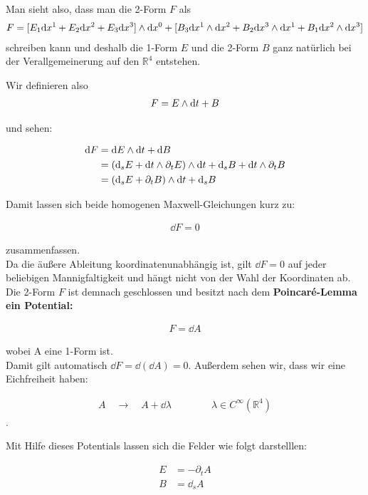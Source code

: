 Man sieht also, dass man die 2-Form $F$ als
\begin{align}
F =  [E_1 \dd x^1 +E_2 \dd x^2 + E_3 \dd x^3] \wedge \dd x^0 + [B_3 \dd x^1 \wedge \dd x^2 + B_2 \dd x^3 \wedge \dd x^1 + B_1 \dd x^2 \wedge \dd x^3]
\end{align}
schreiben kann und deshalb die 1-Form $E$ und die 2-Form $B$ ganz natürlich bei der Verallgemeinerung auf den $\mathbb{R}^4$ entstehen.

Wir definieren also
\begin{align}  
F= E \wedge \dd t + B 
\end{align} 

und sehen:

\begin{align}
\dd F &= \dd E \wedge \dd t + \dd B \notag \\
		&= (\dd_s E + \dd t \wedge \partial_t E ) \wedge \dd t + \dd_s B + \dd t \wedge \partial_t B \notag \\
		&= (\dd_s E + \partial_t B) \wedge \dd t + \dd_s B
\end{align}

Damit lassen sich beide homogenen Maxwell-Gleichungen kurz zu: 

\begin{align}
\dd F = 0
\end{align}

zusammenfassen. \\

Da die äußere Ableitung koordinatenunabhängig ist, gilt $\dd F = 0$ auf jeder beliebigen Mannigfaltigkeit und hängt nicht von der Wahl der Koordinaten ab. \\
Die 2-Form $F$ ist demnach geschlossen und besitzt nach dem \bfseries Poincaré-Lemma \normalfont ein Potential:

\begin{align}
F = \dd A 
\end{align}

wobei A eine 1-Form ist. \\
Damit gilt automatisch $ \dd F = \dd (\dd A) = 0$. Außerdem sehen wir, dass wir eine Eichfreiheit haben:

\begin{align}
A \quad \rightarrow \quad A + \dd \lambda \qquad\qquad \lambda \in C^{\infty}(\mathbb{R}^4)
\end{align}.

Mit Hilfe dieses Potentials lassen sich die Felder wie folgt darstelllen:

\begin{align}
E &= -\partial_t A \\
B &= \dd_s A
\end{align}

